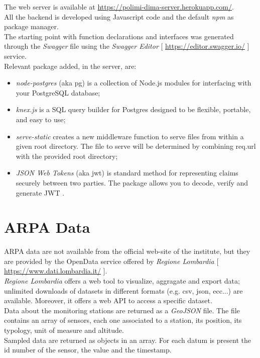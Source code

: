 The web server is available at \url{https://polimi-dima-server.herokuapp.com/}.\\

All the backend is developed using Javascript code and the default \textit{npm} as package manager.\\

The starting point with function declarations and interfaces was generated through the \textit{Swagger} file using the \textit{Swagger Editor} [ \url{https://editor.swagger.io/} ] service.\\

Relevant package added, in the server, are:
\begin{itemize}
    \item \textit{node-postgres} (aka pg) is a collection of Node.js modules for interfacing with your PostgreSQL database;
    \item \textit{knex.js} is a SQL query builder for Postgres designed to be flexible, portable, and easy to use;
    \item \textit{serve-static} creates a new middleware function to serve files from within a given root directory. The file to serve will be determined by combining req.url with the provided root directory;
    \item \textit{JSON Web Tokens} (aka jwt) is standard method for representing claims securely between two parties. The package allows you to decode, verify and generate JWT .
\end{itemize}

\section{ARPA Data}
ARPA data are not available from the official web-site of the institute, but they are provided by the OpenData service offered by \textit{Regione Lombardia} [ \url{https://www.dati.lombardia.it/} ].\\

\textit{Regione Lombardia} offers a web tool to visualize, aggragate and export data; unlimited downloads of datasets in different formats (e.g. csv, json, ecc...) are available.
Moreover, it offers a web API to access a specific dataset.\\

Data about the monitoring stations are returned as a \textit{GeoJSON} file. The file contains an array of sensors, each one associated to a station, its position, its typology, unit of measure and altitude.\\

Sampled data are returned as objects in an array. For each datum is present the id number of the sensor, the value and the timestamp.
